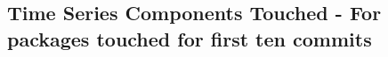 \subsection{Time Series Components Touched - For packages touched for first ten commits} 


\clearpage

